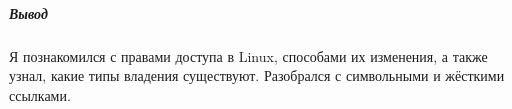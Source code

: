 \documentclass[oneside,final,14pt]{extreport}
\begin{document}
    
    \newpage
    
    
    \subparagraph{Вывод}
    Я познакомился с правами доступа в Linux, способами их изменения, а также узнал, какие типы владения существуют.
    Разобрался с символьными и жёсткими ссылками.
\end{document}
